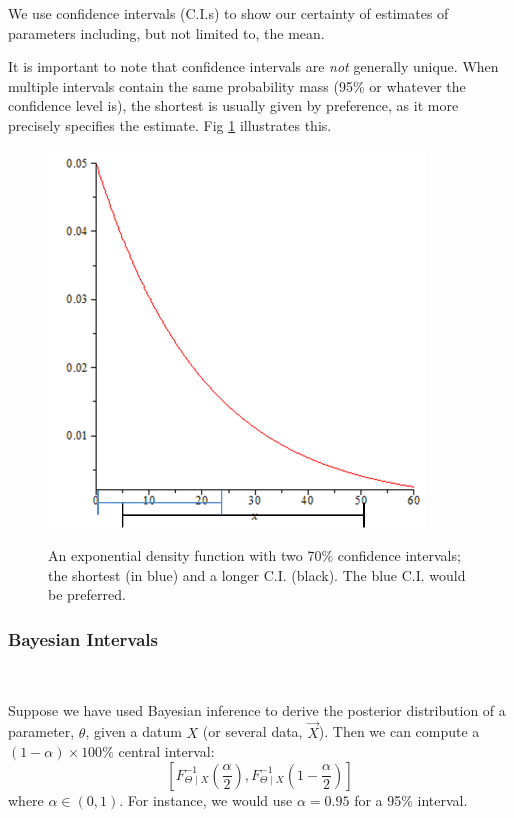 \documentclass[12pt,a4paper]{article}
\begin{document}
We use confidence intervals (C.I.s) to show our certainty of estimates of parameters including, but not limited to, the mean.

It is important to note that confidence intervals are \emph{not} generally unique. When multiple intervals contain the same probability mass (95\% or whatever the confidence level is), the shortest is usually given by preference, as it more precisely specifies the estimate. Fig \ref{confidence intervals} illustrates this.

\begin{figure}[h]
\begin{center}
\includegraphics[height=10cm,width=10cm]{M2S1 Confidence Intervals.png}\label{confidence intervals}
\caption{An exponential density function with two 70\% confidence intervals; the shortest (in blue) and a longer C.I. (black). The blue C.I. would be preferred.}
\end{center}
\end{figure}

\subsubsection{Bayesian Intervals}$\;$

Suppose we have used Bayesian inference to derive the posterior distribution of a parameter, $\theta$, given a datum $X$ (or several data, $\vec{X}$). Then we can compute a $(1-\alpha)\times 100\%$ central interval:
$$\left[ F_{\Theta\mid X}^{-1} \left(\frac{\alpha}{2}\right), F_{\Theta\mid X}^{-1} \left(1-\frac{\alpha}{2}\right)\right]$$
where $\alpha \in (0,1)$. For instance, we would use $\alpha=0.95$ for a 95\% interval.
\end{document}

